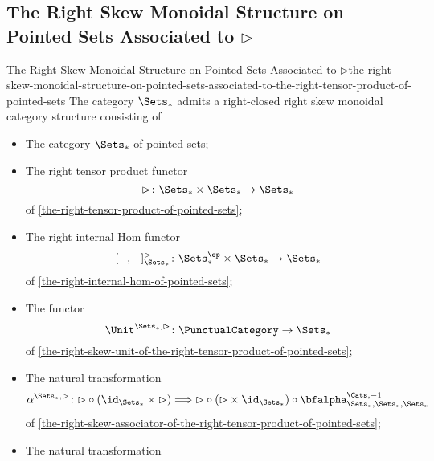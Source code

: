 \subsection{The Right Skew Monoidal Structure on Pointed Sets Associated to $\rhd$}\label{subsection-the-right-skew-monoidal-structure-on-pointed-sets-associated-to-the-right-tensor-product-of-pointed-sets-of-pointed-sets}
\begin{proposition}{The Right Skew Monoidal Structure on Pointed Sets Associated to $\rhd$}{the-right-skew-monoidal-structure-on-pointed-sets-associated-to-the-right-tensor-product-of-pointed-sets}%
    The category $\Sets_{*}$ admits a right-closed right skew monoidal category structure consisting of%
    \begin{itemize}
        \item{}The category $\Sets_{*}$ of pointed sets;
        \item{}The right tensor product functor
            \[
                \rhd%
                \colon%
                \Sets_{*}\times\Sets_{*}%
                \to%
                \Sets_{*}
            \]%
            of \cref{the-right-tensor-product-of-pointed-sets};
        \item{}The right internal Hom functor
            \[
                [-,-]^{\rhd}_{\Sets_{*}}%
                \colon%
                \Sets^{\op}_{*}\times\Sets_{*}%
                \to%
                \Sets_{*}%
            \]%
            of \cref{the-right-internal-hom-of-pointed-sets};
        \item{}The functor
            \[
                \Unit^{\Sets_{*},\rhd}
                \colon
                \PunctualCategory
                \to
                \Sets_{*}
            \]
            of \cref{the-right-skew-unit-of-the-right-tensor-product-of-pointed-sets};
        \item{}The natural transformation
            \[
                \alpha^{\Sets_{*},\rhd}
                \colon
                {\rhd}\circ{(\id_{\Sets_{*}}\times{\rhd})}
                \Longrightarrow%
                {\rhd}\circ{({\rhd}\times\id_{\Sets_{*}})}\circ{\bfalpha^{\Cats,-1}_{\Sets_{*},\Sets_{*},\Sets_{*}}}%
            \]
            of \cref{the-right-skew-associator-of-the-right-tensor-product-of-pointed-sets};
        \item{}The natural transformation

\end{itemize}
\end{proposition}

